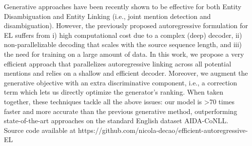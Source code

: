 Generative approaches have been recently shown to be effective for both Entity Disambiguation and Entity Linking (i.e., joint mention detection and disambiguation). However, the previously proposed autoregressive formulation for EL suffers from i) high computational cost due to a complex (deep) decoder, ii) non-parallelizable decoding that scales with the source sequence length, and iii) the need for training on a large amount of data. In this work, we propose a very efficient approach that parallelizes autoregressive linking across all potential mentions and relies on a shallow and efficient decoder. Moreover, we augment the generative objective with an extra discriminative component, i.e., a correction term which lets us directly optimize the generator's ranking. When taken together, these techniques tackle all the above issues: our model is >70 times faster and more accurate than the previous generative method, outperforming state-of-the-art approaches on the standard English dataset AIDA-CoNLL. Source code available at https://github.com/nicola-decao/efficient-autoregressive-EL
